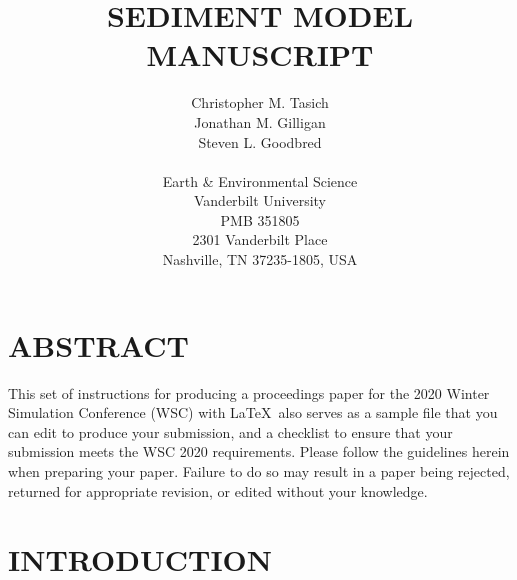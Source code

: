 \documentclass{wscpaperproc}
\theoremstyle{wsc}
\begin{document}
%
%

\title{SEDIMENT MODEL MANUSCRIPT}

\author{Christopher M. Tasich \\
Jonathan M. Gilligan \\
Steven L. Goodbred \\
\vspace{12pt} \\
Earth \& Environmental Science \\
Vanderbilt University \\
PMB 351805 \\
2301 Vanderbilt Place  \\
Nashville, TN 37235-1805, USA
}



\maketitle

\section*{ABSTRACT}
This set of instructions for producing a proceedings paper for the 2020 Winter Simulation Conference (WSC) with \LaTeX\ also serves as a sample file that you can edit to produce your submission, and a checklist to ensure that your submission meets the WSC 2020 requirements. Please follow the guidelines herein when preparing your paper. Failure to do so may result in a paper being rejected, returned for appropriate revision, or edited without your knowledge.

\section{INTRODUCTION}
\end{document}
